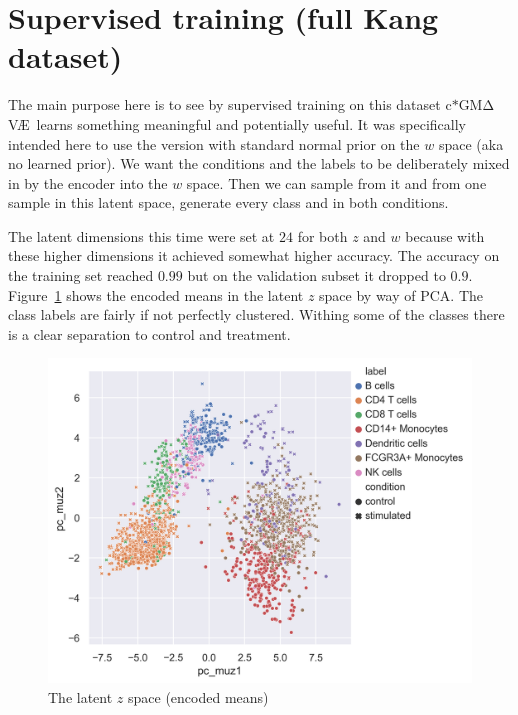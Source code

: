 \documentclass[11pt, a4paper]{report}
\theoremstyle{plain}
\theoremstyle{definition}
\theoremstyle{remark}
\newcommand{\gmvae}{c$\ast$GM$\mathrm{\Delta}$V\AE~}
\begin{document}
\section{Supervised training (full Kang dataset)}

The main purpose here is to see by supervised training on
this dataset \gmvae learns something meaningful and potentially useful.
It was specifically intended here to use the version with standard normal prior on the $w$
space (aka no learned prior). We want the conditions and the labels to be deliberately mixed in by the encoder
into the $w$ space. Then we can sample from it and from one sample in this
latent space, generate every class and in both conditions.

The latent dimensions this time were set at $24$ for both $z$ and $w$ because
with these higher dimensions it achieved somewhat higher accuracy.
The accuracy on the training set reached $0.99$ but on the validation subset it
dropped to $0.9$. Figure~\ref{fig:Kang_super_val_mu_z} shows the encoded means
in the latent $z$ space by way of PCA. The class labels are fairly if not
perfectly clustered. Withing some of the classes there is a clear separation to
control and treatment.

\begin{figure}[h]
\centering
\includegraphics[width=1.1\textwidth]{images/Kang_super_val_mu_z.png}
\caption{
The latent $z$ space (encoded means)
}
\label{fig:Kang_super_val_mu_z}
\end{figure}
\end{document}
